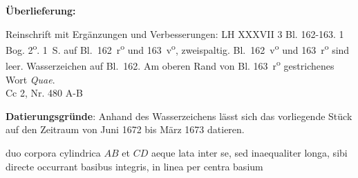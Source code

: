 \begin{ledgroupsized}[r]{120mm}
\footnotesize
\pstart
\noindent\textbf{\"{U}berlieferung:}
\pend
\end{ledgroupsized}
%
\begin{ledgroupsized}[r]{114mm}
\footnotesize
\pstart \parindent -6mm
%
Reinschrift mit Ergänzungen und 
Verbesserungen: LH XXXVII 3 Bl. 162-163. 1 Bog. 2\textsuperscript{o}.
1\, S. auf Bl.~162~r\textsuperscript{o} und 163~v\textsuperscript{o}, zweispaltig.
Bl.~162~v\textsuperscript{o} und 163~r\textsuperscript{o} sind leer.
Wasserzeichen auf Bl.~162. Am oberen Rand von Bl. 163~r\textsuperscript{o} gestrichenes Wort \textit{Quae}.
\\%
Cc 2, Nr. 480 A-B
\pend
\end{ledgroupsized}
%
\vspace*{5mm}
\begin{ledgroup}
\footnotesize
\pstart
\noindent\footnotesize{\textbf{Datierungsgr\"{u}nde}:
Anhand des Wasserzeichens lässt sich das vorliegende Stück auf den Zeitraum von Juni 1672 bis März 1673 datieren.}
\pend
\end{ledgroup}
%
\vspace*{8mm}
\count{}
\count{}
\count{}
\pstart%
\normalsize%
\noindent%
[162~r\textsuperscript{o}]  duo corpora cylindrica\protect{} $AB$ et $CD$ aeque lata inter se, sed inaequaliter longa, sibi directe occurrant basibus integris, in linea per centra basium

